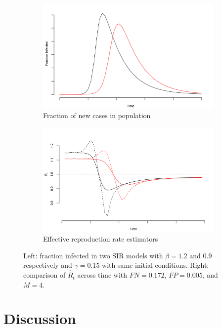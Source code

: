 \documentclass[12pt]{amsart}
\numberwithin{equation}{section}
\theoremstyle{plain}
\begin{document}
\begin{figure}
\centering
\begin{subfigure}{.5\textwidth}
  \centering
  \includegraphics[width=.9\linewidth]{../methods/figs/sir.png}
  \caption{Fraction of new cases in population}
  \label{fig:fracpop}
\end{subfigure}%
\begin{subfigure}{.5\textwidth}
  \centering
  \includegraphics[width=.9\linewidth]{../methods/figs/sir_rt_comparison.png}
  \caption{Effective reproduction rate estimators}
  \label{fig:eff}
\end{subfigure}
\caption{Left: fraction infected in two SIR models with $\beta = 1.2$ and $0.9$ respectively and $\gamma = 0.15$ with same initial conditions. Right: comparison of $\hat R_t$ across time with $FN = 0.172$, $FP = 0.005$, and $M = 4$.}
\label{fig:comparison}
\end{figure}

\section{Discussion}
\label{section:discussion}
\end{document}
